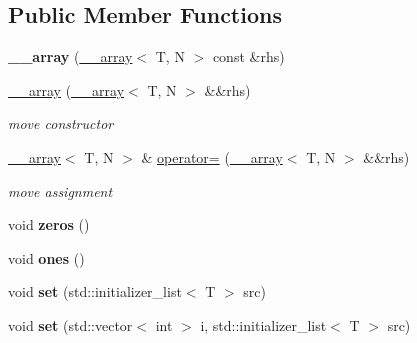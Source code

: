 \subsection*{Public Member Functions}
\begin{DoxyCompactItemize}
\item 
\hypertarget{class____array_ac3443fee161fd3f8ccb1290980a4190d}{
{\bfseries \_\-\_\-array} (\hyperlink{class____array}{\_\-\_\-array}$<$ T, N $>$ const \&rhs)}
\label{class____array_ac3443fee161fd3f8ccb1290980a4190d}

\item 
\hypertarget{class____array_a852355254391a277489da13f24368e5d}{
\hyperlink{class____array_a852355254391a277489da13f24368e5d}{\_\-\_\-array} (\hyperlink{class____array}{\_\-\_\-array}$<$ T, N $>$ \&\&rhs)}
\label{class____array_a852355254391a277489da13f24368e5d}

\begin{DoxyCompactList}\small\item\em move constructor \item\end{DoxyCompactList}\item 
\hypertarget{class____array_a0ff453aafc86af9a4dbe89968b733fff}{
\hyperlink{class____array}{\_\-\_\-array}$<$ T, N $>$ \& \hyperlink{class____array_a0ff453aafc86af9a4dbe89968b733fff}{operator=} (\hyperlink{class____array}{\_\-\_\-array}$<$ T, N $>$ \&\&rhs)}
\label{class____array_a0ff453aafc86af9a4dbe89968b733fff}

\begin{DoxyCompactList}\small\item\em move assignment \item\end{DoxyCompactList}\item 
\hypertarget{class____array_a1072f5c538102121515000a4ef521303}{
void {\bfseries zeros} ()}
\label{class____array_a1072f5c538102121515000a4ef521303}

\item 
\hypertarget{class____array_ad1fd7d5c46fb341f54cab916b78be561}{
void {\bfseries ones} ()}
\label{class____array_ad1fd7d5c46fb341f54cab916b78be561}

\item 
\hypertarget{class____array_ae6a7f942aeb5857504e9db83f7cfac57}{
void {\bfseries set} (std::initializer\_\-list$<$ T $>$ src)}
\label{class____array_ae6a7f942aeb5857504e9db83f7cfac57}

\item 
\hypertarget{class____array_a483485b393733908c01c2cb2e74d08e0}{
void {\bfseries set} (std::vector$<$ int $>$ i, std::initializer\_\-list$<$ T $>$ src)}
\label{class____array_a483485b393733908c01c2cb2e74d08e0}


\end{DoxyCompactItemize}
